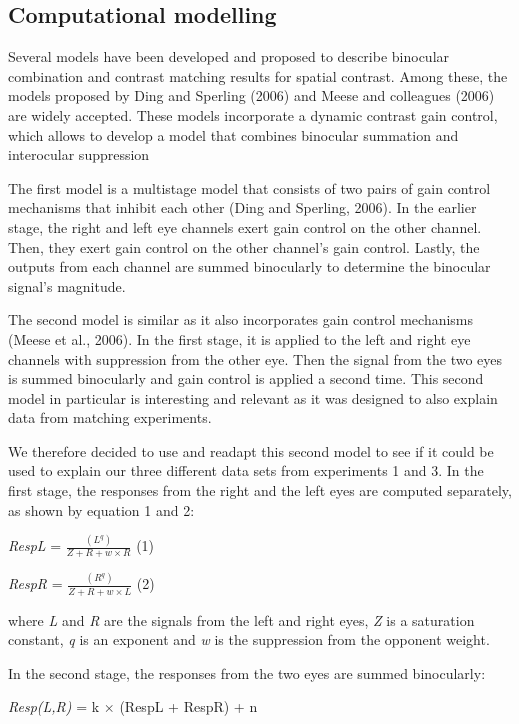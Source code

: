 \documentclass[
]{article}
\begin{document}
\hypertarget{computational-modelling}{%
\subsection{Computational modelling}\label{computational-modelling}}

Several models have been developed and proposed to describe binocular combination and contrast matching results for spatial contrast. Among these, the models proposed by Ding and Sperling (2006) and Meese and colleagues (2006) are widely accepted. These models incorporate a dynamic contrast gain control, which allows to develop a model that combines binocular summation and interocular suppression

The first model is a multistage model that consists of two pairs of gain control mechanisms that inhibit each other (Ding and Sperling, 2006). In the earlier stage, the right and left eye channels exert gain control on the other channel. Then, they exert gain control on the other channel's gain control. Lastly, the outputs from each channel are summed binocularly to determine the binocular signal's magnitude.

The second model is similar as it also incorporates gain control mechanisms (Meese et al., 2006). In the first stage, it is applied to the left and right eye channels with suppression from the other eye. Then the signal from the two eyes is summed binocularly and gain control is applied a second time. This second model in particular is interesting and relevant as it was designed to also explain data from matching experiments.

We therefore decided to use and readapt this second model to see if it could be used to explain our three different data sets from experiments 1 and 3. In the first stage, the responses from the right and the left eyes are computed separately, as shown by equation 1 and 2:

\emph{RespL} = \(\frac{(L^q)}{Z + R + w \times R}\) (1)

\emph{RespR} = \(\frac{(R^q)}{Z + R + w \times L}\) (2)

where \emph{L} and \emph{R} are the signals from the left and right eyes, \emph{Z} is a saturation constant, \emph{q} is an exponent and \emph{w} is the suppression from the opponent weight.

In the second stage, the responses from the two eyes are summed binocularly:

\emph{Resp(L,R)} = k \(\times\) (RespL + RespR) + n
\end{document}

